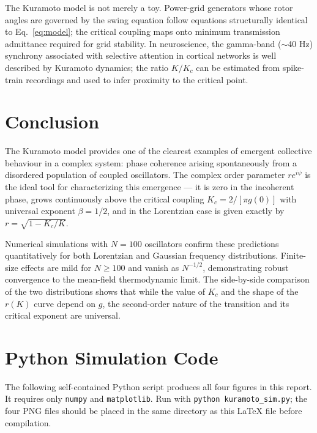 \documentclass[12pt,a4paper]{article}
\begin{document}
The Kuramoto model is not merely a toy.
Power-grid generators whose rotor angles are governed by the swing
equation follow equations structurally identical to Eq.~\eqref{eq:model};
the critical coupling maps onto minimum transmission admittance required
for grid stability.
In neuroscience, the gamma-band ($\sim$40 Hz) synchrony associated with
selective attention in cortical networks is well described by Kuramoto
dynamics; the ratio $K/K_c$ can be estimated from spike-train recordings
and used to infer proximity to the critical point.

\section{Conclusion}
\label{sec:conclusion}

The Kuramoto model provides one of the clearest examples of emergent
collective behaviour in a complex system: phase coherence arising
spontaneously from a disordered population of coupled oscillators.
The complex order parameter $re^{i\psi}$ is the ideal tool for
characterizing this emergence — it is zero in the incoherent phase,
grows continuously above the critical coupling $K_c = 2/[\pi g(0)]$
with universal exponent $\beta = 1/2$, and in the Lorentzian case
is given exactly by $r = \sqrt{1 - K_c/K}$.

Numerical simulations with $N = 100$ oscillators confirm these predictions
quantitatively for both Lorentzian and Gaussian frequency distributions.
Finite-size effects are mild for $N \geq 100$ and vanish as $N^{-1/2}$,
demonstrating robust convergence to the mean-field thermodynamic limit.
The side-by-side comparison of the two distributions shows that while
the value of $K_c$ and the shape of the $r(K)$ curve depend on $g$,
the second-order nature of the transition and its critical exponent
are universal.

\appendix

\section{Python Simulation Code}
\label{app:code}

The following self-contained Python script produces all four figures
in this report.
It requires only \texttt{numpy} and \texttt{matplotlib}.
Run with \texttt{python kuramoto\_sim.py}; the four PNG files should be
placed in the same directory as this \LaTeX{} file before compilation.
\end{document}
